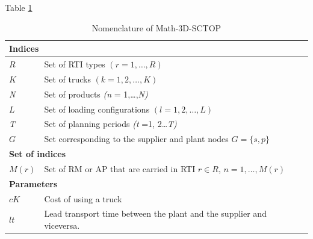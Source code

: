 Table \ref{tab:NomenclaturePLC}
\begin{longtable}[hbt!]{  |p{}|p{}  |}
  \caption{Nomenclature of Math-3D-SCTOP}
  \label{tab:NomenclaturePLC}
  \\
  \hline
  \multicolumn{2}{|l|}{\textbf{Indices}}                                                                                                                                 \\ \hline
  $R$                & Set of RTI types $(r = 1, \dots, R)$                                                                                                              \\
  $K$                & Set of trucks $(k =1,2,\dots , K)$
  \\
  \textit{N}         & Set of products \textit{(n }=   1,…,\textit{N)}                                                                                                   \\
  $L$                & Set of loading configurations $(l =1,2,\dots , L)$
  \\
  \textit{T}         & Set of planning periods \textit{(t} =1, 2…\textit{T)}                                                                                             \\
  $G$                & Set corresponding to the supplier and plant nodes $G = \lbrace s, p \rbrace$                                                                      \\
  \hline
  \multicolumn{2}{|l|}{\textbf{Set of indices}}                                                                                                                          \\ \hline
  $M(r)$             & Set of RM or AP that are carried in RTI $r \in R$, $n = 1, \dots, M(r)$                                                                           \\
  \hline
  \multicolumn{2}{|l|}{\textbf{Parameters}}                                                                                                                              \\ \hline
  $cK$               & Cost of using a truck                                                                                                                             \\
  $lt$               & Lead transport time between the plant and the supplier and viceversa.                                                                             \\

\end{longtable}
